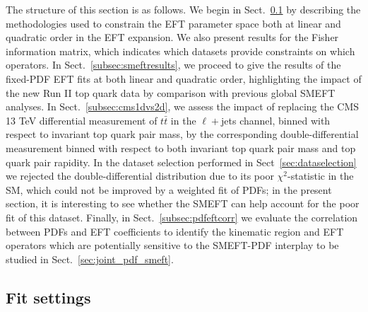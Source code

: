 \documentclass[withindex,glossary]{cam-thesis}
\newcommand{\simunet}{\textsc{SIMUnet}}
\newcommand{\smefit}{\textsc{SMEFiT}}
\begin{document}
The structure of this section is as follows. We begin in Sect.~\ref{subsec:smeftfitsettings} 
by describing the methodologies used
to constrain the EFT parameter space both at linear and quadratic
order in the EFT expansion.
%
We also present results for the Fisher information matrix, which indicates which datasets
provide constraints on which operators.
In Sect.~\ref{subsec:smeftresults}, we proceed to give the results of the fixed-PDF EFT 
fits at both linear and quadratic order,
highlighting the impact of the new Run II top quark data by comparison with 
previous global SMEFT analyses.
%
In Sect.~\ref{subsec:cms1dvs2d}, we assess the impact of replacing the CMS 13 TeV differential
measurement of $t\bar{t}$ in the $\ell+$jets channel, binned with respect to invariant top quark pair
mass, by the corresponding double-differential measurement binned with respect to both invariant
top quark pair mass and top quark pair rapidity. In the dataset selection performed in Sect~\ref{sec:dataselection}
we rejected the double-differential distribution due to its poor $\chi^2$-statistic in the SM, which could
not be improved by a weighted fit of PDFs; in the present section, it is interesting to see whether the
SMEFT can help account for the poor fit of this dataset.
%
Finally, in Sect.~\ref{subsec:pdfeftcorr} we evaluate the correlation between PDFs and EFT coefficients
to identify the kinematic region and EFT operators which are potentially
sensitive to the SMEFT-PDF interplay to be studied in Sect.~\ref{sec:joint_pdf_smeft}.

\subsection{Fit settings}
\label{subsec:smeftfitsettings}
\end{document}
